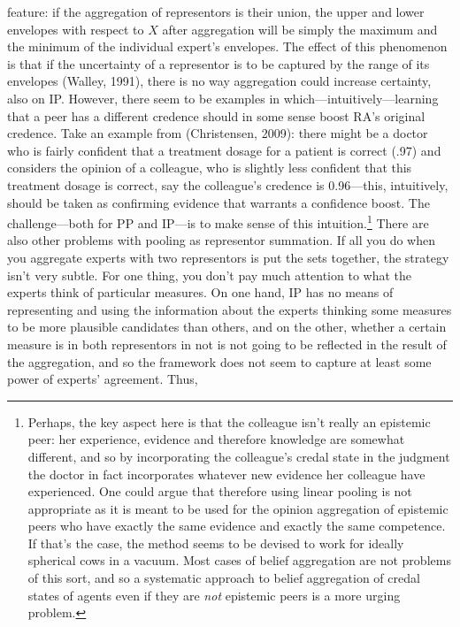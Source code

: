 \documentclass[
  10pt,
  dvipsnames,enabledeprecatedfontcommands]{scrartcl}
\begin{document}
\begin{itemize}
  feature: if the aggregation of representors is their union, the upper
  and lower envelopes with respect to \(X\) after aggregation will be
  simply the maximum and the minimum of the individual expert's
  envelopes. The effect of this phenomenon is that if the uncertainty of
  a representor is to be captured by the range of its envelopes (Walley,
  1991), there is no way aggregation could increase certainty, also on
  IP. However, there seem to be examples in
  which---intuitively---learning that a peer has a different credence
  should in some sense boost RA's original credence. Take an example
  from (Christensen, 2009): there might be a doctor who is fairly
  confident that a treatment dosage for a patient is correct (.97) and
  considers the opinion of a colleague, who is slightly less confident
  that this treatment dosage is correct, say the colleague's credence is
  0.96---this, intuitively, should be taken as confirming evidence that
  warrants a confidence boost. The challenge---both for PP and IP---is
  to make sense of this intuition.\footnote{Perhaps, the key aspect here
    is that the colleague isn't really an epistemic peer: her
    experience, evidence and therefore knowledge are somewhat different,
    and so by incorporating the colleague's credal state in the judgment
    the doctor in fact incorporates whatever new evidence her colleague
    have experienced. One could argue that therefore using linear
    pooling is not appropriate as it is meant to be used for the opinion
    aggregation of epistemic peers who have exactly the same evidence
    and exactly the same competence. If that's the case, the method
    seems to be devised to work for ideally spherical cows in a vacuum.
    Most cases of belief aggregation are not problems of this sort, and
    so a systematic approach to belief aggregation of credal states of
    agents even if they are \emph{not} epistemic peers is a more urging
    problem.} There are also other problems with pooling as representor
  summation. If all you do when you aggregate experts with two
  representors is put the sets together, the strategy isn't very subtle.
  For one thing, you don't pay much attention to what the experts think
  of particular measures. On one hand, IP has no means of representing
  and using the information about the experts thinking some measures to
  be more plausible candidates than others, and on the other, whether a
  certain measure is in both representors in not is not going to be
  reflected in the result of the aggregation, and so the framework does
  not seem to capture at least some power of experts' agreement. Thus,

\end{itemize}
\end{document}
